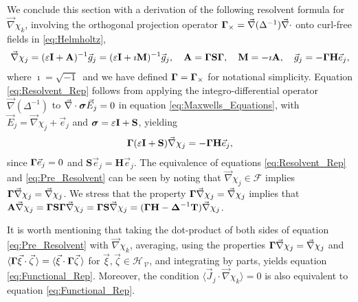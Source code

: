 \documentclass[11pt]{amsart}
\newcommand{\Mb}{\mathbf{M}}
\newcommand{\Tb}{\mathbf{T}}
\newcommand{\Hb}{\mathbf{H}}
\newcommand{\Ib}{\mathbf{I}}
\newcommand{\Sb}{\mathbf{S}}
\newcommand{\Ab}{\mathbf{A}}
\newcommand{\Vc}{\mathcal{V}}
\newcommand{\Hs}{\mathscr{H}}
\newcommand{\Fs}{\mathscr{F}}
\newcommand\bsig{\mbox{\boldmath${\sigma}$}}
\newcommand\bDelta{\mbox{\boldmath${\Delta}$}}
\newcommand\bGamma{\mbox{\boldmath${\Gamma}$}}
\begin{document}
We conclude this section with a derivation of the following resolvent
formula for $\vec{\nabla}\chi_k$, involving the orthogonal projection
operator $\bGamma_\times=\vec{\nabla}(\Delta^{-1})\vec{\nabla}\cdot$ onto curl-free fields in
\eqref{eq:Helmholtz},  
\begin{align}\label{eq:Resolvent_Rep}
  \vec{\nabla}\chi_j=(\varepsilon\Ib+\Ab)^{-1}\vec{g}_j
           =(\varepsilon\Ib+\imath\Mb)^{-1}\vec{g}_j, \quad
  \Ab=\bGamma\Sb\bGamma, \quad
  \Mb=-\imath\Ab, \quad
  \vec{g}_j=-\bGamma\Hb\vec{e}_j,
\end{align}
%
where $\imath=\sqrt{-1}\,$ and we have defined $\bGamma=\bGamma_\times$ for
notational simplicity. Equation \eqref{eq:Resolvent_Rep} follows from
applying the integro-differential operator $\vec{\nabla}(\Delta^{-1})$ to
$\vec{\nabla}\cdot\bsig\vec{E}_j=0$ in equation \eqref{eq:Maxwells_Equations},
with $\vec{E}_j=\vec{\nabla}\chi_j+\vec{e}_j$ and $\bsig=\varepsilon\Ib+\Sb$, yielding  
%
\begin{align}\label{eq:Pre_Resolvent}
  \bGamma(\varepsilon\Ib+\Sb)\vec{\nabla}\chi_j=-\bGamma\Hb\vec{e}_j,
\end{align}
%
since $\bGamma\vec{e}_j=0$ and $\Sb\vec{e}_j=\Hb\vec{e}_j$.
The equivalence of equations \eqref{eq:Resolvent_Rep} and
\eqref{eq:Pre_Resolvent} can be seen by noting that
$\vec{\nabla}\chi_j\in\Fs$ implies $\bGamma\vec{\nabla}\chi_j=\vec{\nabla}\chi_j$. We stress
that the property $\bGamma\vec{\nabla}\chi_j=\vec{\nabla}\chi_j$ implies that
$\Ab\vec{\nabla}\chi_j=\bGamma\Sb\bGamma\vec{\nabla}\chi_j=\bGamma\Sb\vec{\nabla}\chi_j
=(\bGamma\Hb-\bDelta^{-1}\Tb)\vec{\nabla}\chi_j$. 



It is worth mentioning that taking the dot-product of both sides of
equation \eqref{eq:Pre_Resolvent} with $\vec{\nabla}\chi_k$, averaging, using
the properties $\bGamma\vec{\nabla}\chi_j=\vec{\nabla}\chi_j$ and
$\langle\bGamma\vec{\xi}\cdot\vec{\zeta}\,\rangle=\langle\vec{\xi}\cdot\bGamma\vec{\zeta}\,\rangle$ for
$\vec{\xi},\vec{\zeta}\in\Hs_{\,\Vc}$, and integrating by parts, yields
equation  \eqref{eq:Functional_Rep}. Moreover, the condition
$\langle\vec{J}_j\cdot\vec{\nabla}\chi_k\rangle=0$ is also equivalent to equation
\eqref{eq:Functional_Rep}.   
\end{document}
